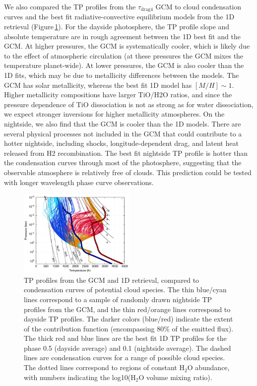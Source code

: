 \documentclass[twocolumn, trackchanges]{aastex61}
\begin{document}
We also compared the TP profiles from the $\tau_\mathrm{drag4}$ GCM to cloud condensation curves and the best fit radiative-convective equilibrium models from the 1D retrieval (Figure\,\ref{fig:TP}).  For the dayside photosphere, the TP profile slope and absolute temperature are in rough agreement between the 1D best fit and the GCM. At higher pressures, the GCM is systematically cooler, which is likely due to the effect of atmospheric circulation (at these pressures the GCM mixes the temperature planet-wide). At lower pressures, the GCM is also cooler than the 1D fits, which may be due to metallicity differences between the models. The GCM has solar metallicity, whereas the best fit 1D model has $[M/H] \sim 1$. Higher metallicity compositions have larger TiO/H2O ratios, and since the pressure dependence of TiO dissociation is not as strong as for water dissociation, we expect stronger inversions for higher metallicity atmospheres.  On the nightside, we also find that the GCM is cooler than the 1D models.  There are several physical processes not included in the GCM that could contribute to a hotter nightside, including shocks, longitude-dependent drag, and latent heat released from H2 recombination.  The best fit nightside TP profile is hotter than the condensation curves through most of the photosphere, suggesting that the observable atmosphere is relatively free of clouds. This prediction could be tested with longer wavelength phase curve observations.


\begin{figure}
\includegraphics[width = 0.5\textwidth]{fig14.pdf}
\caption{TP profiles from the GCM and 1D retrieval, compared to condensation curves of potential cloud species. The thin blue/cyan lines correspond to a sample of randomly drawn nightside TP profiles from the GCM, and the thin red/orange lines correspond to dayside TP profiles. The darker colors (blue/red) indicate the extent of the contribution function (encompassing 80\% of the emitted flux). The thick red and blue lines are the best fit 1D TP profiles for the phase 0.5 (dayside average) and 0.1 (nightside average). The dashed lines are condensation curves for a range of possible cloud species.  The dotted lines correspond to regions of constant H$_2$O abundance, with numbers indicating the log10(H$_2$O volume mixing ratio).}
\label{fig:TP}
\end{figure}
\end{document}
